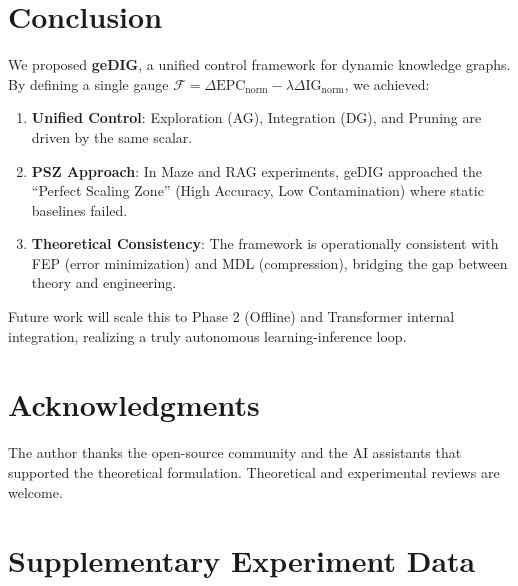 \documentclass[12pt]{article}
\newcommand{\F}{\mathcal{F}}
\newcommand{\gednorm}{\Delta\mathrm{EPC}_{\mathrm{norm}}}
\newcommand{\ignorm}{\Delta\mathrm{IG}_{\mathrm{norm}}}
\begin{document}
\section{Conclusion}
We proposed \textbf{geDIG}, a unified control framework for dynamic knowledge graphs.
By defining a single gauge $\F=\gednorm-\lambda\ignorm$, we achieved:
\begin{enumerate}
    \item \textbf{Unified Control}: Exploration (AG), Integration (DG), and Pruning are driven by the same scalar.
    \item \textbf{PSZ Approach}: In Maze and RAG experiments, geDIG approached the ``Perfect Scaling Zone'' (High Accuracy, Low Contamination) where static baselines failed.
    \item \textbf{Theoretical Consistency}: The framework is operationally consistent with FEP (error minimization) and MDL (compression), bridging the gap between theory and engineering.
\end{enumerate}
Future work will scale this to Phase 2 (Offline) and Transformer internal integration, realizing a truly autonomous learning-inference loop.

\section*{Acknowledgments}
The author thanks the open-source community and the AI assistants that supported the theoretical formulation. Theoretical and experimental reviews are welcome.




\appendix

\section{Supplementary Experiment Data}
\end{document}
